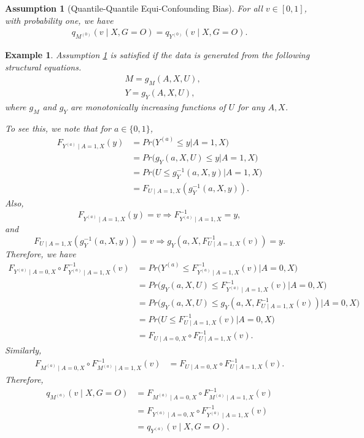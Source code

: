 \documentclass[10pt]{article}
\newtheorem{example}{Example}
\newtheorem{assumption}{Assumption}
\begin{document}
\begin{assumption}[Quantile-Quantile Equi-Confounding Bias]
\label{assumption:QQEqui}
For all $v\in[0,1]$, with probability one, we have
\begin{align*}
q_{M^{(0)}}(v\mid X,G=O)=q_{Y^{(0)}}(v\mid X,G=O).
\end{align*}	
\end{assumption}

\begin{example}
Assumption \ref{assumption:QQEqui} is satisfied if the data is generated from the following structural equations.
\begin{align*}
&M=g_M(A,X,U),\\
&Y= g_Y(A,X,U),
\end{align*}
where $g_M$ and $g_Y$ are monotonically increasing functions of $U$ for any $A,X$.

To see this, we note that for $a\in\{0,1\}$,
\begin{align*}
F_{Y^{(a)}\mid A=1,X}(y)
&=Pr\big( Y^{(a)}\le y \big| A=1,X\big)\\
&=Pr\big( g_Y(a,X,U)\le y \big| A=1,X\big)\\
&=Pr\big( U\le g^{-1}_Y(a,X,y) \big| A=1,X\big)\\
&=F_{U\mid A=1,X}(g^{-1}_Y(a,X,y)).
\end{align*}
Also,
\[
F_{Y^{(a)}\mid A=1,X}(y)=v\Rightarrow F^{-1}_{Y^{(a)}\mid A=1,X}=y,
\]
and
\[
F_{U\mid A=1,X}(g^{-1}_Y(a,X,y))=v\Rightarrow g_Y(a,X,F^{-1}_{U\mid A=1,X}(v))=y.
\]
Therefore, we have
\begin{align*}
F_{Y^{(a)}\mid A=0,X}\circ F^{-1}_{Y^{(a)}\mid A=1,X}(v)
&=Pr\big( Y^{(a)}\le F^{-1}_{Y^{(a)}\mid A=1,X}(v) \big| A=0,X\big)\\
&=Pr\big( g_Y(a,X,U)\le F^{-1}_{Y^{(a)}\mid A=1,X}(v) \big| A=0,X\big)\\
&=Pr\big( g_Y(a,X,U)\le g_Y(a,X,F^{-1}_{U\mid A=1,X}(v)) \big| A=0,X\big)\\
&=Pr\big( U\le F^{-1}_{U\mid A=1,X}(v) \big| A=0,X\big)\\
&=F_{U\mid A=0,X}\circ F^{-1}_{U\mid A=1,X}(v).
\end{align*}
Similarly,
\begin{align*}
F_{M^{(a)}\mid A=0,X}\circ F^{-1}_{M^{(a)}\mid A=1,X}(v)
&=F_{U\mid A=0,X}\circ F^{-1}_{U\mid A=1,X}(v).
\end{align*}
Therefore,
\begin{align*}
q_{M^{(a)}}(v\mid X,G=O)
&=F_{M^{(a)}\mid A=0,X}\circ F^{-1}_{M^{(a)}\mid A=1,X}(v)\\
&=F_{Y^{(a)}\mid A=0,X}\circ F^{-1}_{Y^{(a)}\mid A=1,X}(v)\\
&=q_{Y^{(a)}}(v\mid X,G=O).
\end{align*}

\end{example}
\end{document}
